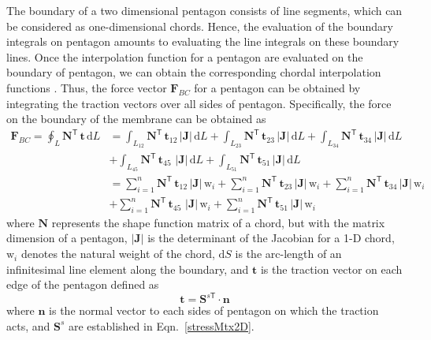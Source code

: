 The boundary of a two dimensional pentagon consists of line segments, which can be considered as one-dimensional chords. Hence, the evaluation of the boundary integrals on pentagon amounts to evaluating the line integrals on these boundary lines. Once the interpolation function for a pentagon are evaluated on the boundary of pentagon, we can obtain the corresponding chordal interpolation functions \cite{Reddy93}.
Thus, the force vector $\mathbf{F}_{BC}$  for a pentagon can be obtained by integrating the traction vectors over all sides of pentagon. Specifically, the force on the boundary of the membrane can be obtained as
\begin{equation}
\begin{aligned}
\mathbf{F}_{BC}  = \oint_L \mathbf{N}^{\mathsf{T}} \, \mathbf{t} \, \mathrm{d} L & = \int_{L_{12}} \mathbf{N}^{\mathsf{T}} \, \mathbf{t}_{12} \,|\mathbf{J}| \, \mathrm{d} L + \int_{L_{23}} \mathbf{N}^{\mathsf{T}} \, \mathbf{t}_{23} \,|\mathbf{J}| \, \mathrm{d} L + \int_{L_{34}} \mathbf{N}^{\mathsf{T}} \, \mathbf{t}_{34} \,|\mathbf{J}| \, \mathrm{d} L \\
& + \int_{L_{45}} \mathbf{N}^{\mathsf{T}} \, \mathbf{t}_{45} \, \,|\mathbf{J}| \, \mathrm{d} L + \int_{L_{51}} \mathbf{N}^{\mathsf{T}} \, \mathbf{t}_{51} \,|\mathbf{J}| \, \mathrm{d} L \\
& = \sum_{i=1}^{n} \mathbf{N}^{\mathsf{T}} \, \mathbf{t}_{12} \,|\mathbf{J}| \, \mathrm{w}_i + \sum_{i=1}^{n} \mathbf{N}^{\mathsf{T}} \, \mathbf{t}_{23} \,|\mathbf{J}| \, \mathrm{w}_i + \sum_{i=1}^{n} \mathbf{N}^{\mathsf{T}} \, \mathbf{t}_{34} \,|\mathbf{J}| \, \mathrm{w}_i \\
& + \sum_{i=1}^{n} \mathbf{N}^{\mathsf{T}} \, \mathbf{t}_{45} \, \,|\mathbf{J}| \, \mathrm{w}_i + \sum_{i=1}^{n} \mathbf{N}^{\mathsf{T}} \, \mathbf{t}_{51} \,|\mathbf{J}| \, \mathrm{w}_i
\end{aligned}
\end{equation}
where $\mathbf{N}$ represents the shape function matrix of a chord, but with the matrix dimension of a pentagon, $|\mathbf{J}|$ is the determinant of the Jacobian for a 1-D chord, $\mathrm{w}_i$ denotes the natural weight of the chord, $\mathrm{d} S$ is the arc-length of an infinitesimal line element along the boundary, and $\mathbf{t}$ is the traction vector on each edge of the pentagon defined as
\begin{equation}
\mathbf{t} = \mathbf{S}^{s\mathsf{T}} \cdot \mathbf{n} 
\end{equation}
where $ \mathbf{n} $ is the normal vector to each sides of pentagon on which the traction acts, and $\mathbf{S}^s $ are established in Eqn.~\eqref{stressMtx2D}.

